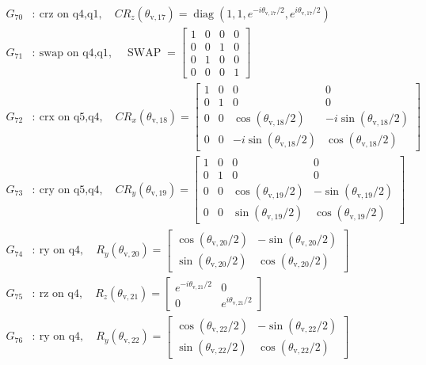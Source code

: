 \begin{align*}
G_{70}&:\ \text{crz on q4,q1},\quad CR_z(\theta_{\mathrm{v},17})=\operatorname{diag}(1,1,e^{-i\theta_{\mathrm{v},17}/2},e^{i\theta_{\mathrm{v},17}/2})\\
G_{71}&:\ \text{swap on q4,q1},\quad \operatorname{SWAP}=\begin{bmatrix}1&0&0&0\\0&0&1&0\\0&1&0&0\\0&0&0&1\end{bmatrix}\\
G_{72}&:\ \text{crx on q5,q4},\quad CR_x(\theta_{\mathrm{v},18})=\begin{bmatrix}1&0&0&0\\0&1&0&0\\0&0&\cos(\theta_{\mathrm{v},18}/2)&-i\sin(\theta_{\mathrm{v},18}/2)\\0&0&-i\sin(\theta_{\mathrm{v},18}/2)&\cos(\theta_{\mathrm{v},18}/2)\end{bmatrix}\\
G_{73}&:\ \text{cry on q5,q4},\quad CR_y(\theta_{\mathrm{v},19})=\begin{bmatrix}1&0&0&0\\0&1&0&0\\0&0&\cos(\theta_{\mathrm{v},19}/2)&-\sin(\theta_{\mathrm{v},19}/2)\\0&0&\sin(\theta_{\mathrm{v},19}/2)&\cos(\theta_{\mathrm{v},19}/2)\end{bmatrix}\\
G_{74}&:\ \text{ry on q4},\quad R_y(\theta_{\mathrm{v},20})=\begin{bmatrix}\cos(\theta_{\mathrm{v},20}/2)&-\sin(\theta_{\mathrm{v},20}/2)\\\sin(\theta_{\mathrm{v},20}/2)&\cos(\theta_{\mathrm{v},20}/2)\end{bmatrix}\\
G_{75}&:\ \text{rz on q4},\quad R_z(\theta_{\mathrm{v},21})=\begin{bmatrix}e^{-i\theta_{\mathrm{v},21}/2}&0\\0&e^{i\theta_{\mathrm{v},21}/2}\end{bmatrix}\\
G_{76}&:\ \text{ry on q4},\quad R_y(\theta_{\mathrm{v},22})=\begin{bmatrix}\cos(\theta_{\mathrm{v},22}/2)&-\sin(\theta_{\mathrm{v},22}/2)\\\sin(\theta_{\mathrm{v},22}/2)&\cos(\theta_{\mathrm{v},22}/2)\end{bmatrix}\\

\end{align*}
